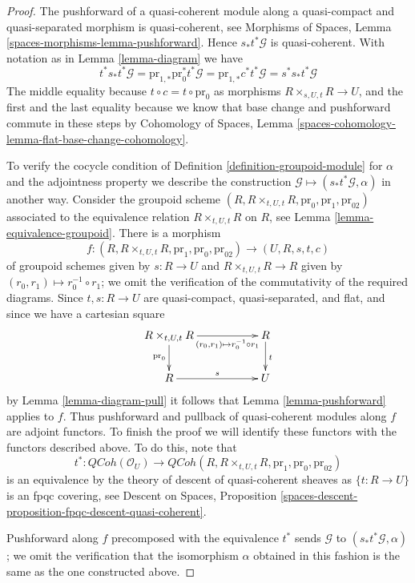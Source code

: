\documentclass{stacks-project}
\theoremstyle{plain}
\theoremstyle{definition}
\theoremstyle{remark}
\numberwithin{equation}{subsection}
\def\QCoh{\mathit{QCoh}}
\begin{document}
\begin{proof}
The pushforward of a quasi-coherent module along a quasi-compact and
quasi-separated morphism is quasi-coherent, see
Morphisms of Spaces, Lemma \ref{spaces-morphisms-lemma-pushforward}.
Hence $s_*t^*\mathcal{G}$
is quasi-coherent. With notation as in Lemma \ref{lemma-diagram} we have
$$
t^*s_*t^*\mathcal{G} =
\text{pr}_{1, *}\text{pr}_0^*t^*\mathcal{G} =
\text{pr}_{1, *}c^*t^*\mathcal{G} =
s^*s_*t^*\mathcal{G}
$$
The middle equality because $t \circ c = t \circ \text{pr}_0$ as
morphisms $R \times_{s, U, t} R \to U$, and the first and the last
equality because we know that base change and pushforward commute in
these steps by
Cohomology of Spaces, Lemma
\ref{spaces-cohomology-lemma-flat-base-change-cohomology}.

\medskip\noindent
To verify the cocycle condition of Definition \ref{definition-groupoid-module}
for $\alpha$ and the adjointness property we describe the construction
$\mathcal{G} \mapsto (s_*t^*\mathcal{G}, \alpha)$ in another way.
Consider the groupoid scheme
$(R, R \times_{t, U, t} R, \text{pr}_0, \text{pr}_1, \text{pr}_{02})$
associated to the equivalence relation $R \times_{t, U, t} R$
on $R$, see Lemma \ref{lemma-equivalence-groupoid}.
There is a morphism
$$
f :
(R, R \times_{t, U, t} R, \text{pr}_1, \text{pr}_0, \text{pr}_{02})
\longrightarrow
(U, R, s, t, c)
$$
of groupoid schemes given by $s : R \to U$ and $R \times_{t, U, t} R \to R$
given by $(r_0, r_1) \mapsto r_0^{-1} \circ r_1$; we omit the verification
of the commutativity of the required diagrams. Since
$t, s : R \to U$ are quasi-compact, quasi-separated, and flat,
and since we have a cartesian square
$$
\xymatrix{
R \times_{t, U, t} R \ar[d]_{\text{pr}_0}
\ar[rr]_-{(r_0, r_1) \mapsto r_0^{-1} \circ r_1} & & R \ar[d]^t \\
R \ar[rr]^s & & U
}
$$
by Lemma \ref{lemma-diagram-pull} it follows that
Lemma \ref{lemma-pushforward} applies to $f$.
Thus pushforward and pullback of quasi-coherent modules along
$f$ are adjoint functors. To finish the proof we will identify these functors
with the functors described above. To do this, note that
$$
t^* :
\QCoh(\mathcal{O}_U)
\longrightarrow
\QCoh(R, R \times_{t, U, t} R, \text{pr}_1, \text{pr}_0, \text{pr}_{02})
$$
is an equivalence by the theory of descent of quasi-coherent sheaves as
$\{t : R \to U\}$ is an fpqc covering, see
Descent on Spaces, Proposition
\ref{spaces-descent-proposition-fpqc-descent-quasi-coherent}.

\medskip\noindent
Pushforward along $f$ precomposed with the equivalence $t^*$ sends
$\mathcal{G}$ to $(s_*t^*\mathcal{G}, \alpha)$;
we omit the verification that the isomorphism $\alpha$
obtained in this fashion is the same as the one constructed above.


\end{proof}
\end{document}
